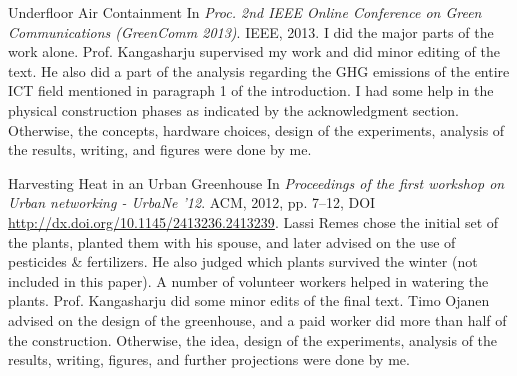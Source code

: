 {Underfloor Air Containment}
{In \textit{Proc. 2nd IEEE Online Conference on Green Communications
(GreenComm 2013)}. IEEE, 2013.}
{}
{I did the major parts of the work alone. Prof. Kangasharju supervised my work
and did minor editing of the text. He also did a part of the analysis
regarding the GHG emissions of the entire ICT field mentioned in paragraph 1
of the introduction. I had some help in the physical construction phases as
indicated by the acknowledgment section.  Otherwise, the concepts, hardware
choices, design of the experiments, analysis of the results, writing, and
figures were done by me.}
\label{pub:uac}


\label{theme:harvesting}

{Harvesting Heat in an Urban Greenhouse}
{In \textit{Proceedings of the first workshop on Urban networking - UrbaNe
'12}. ACM, 2012, pp. 7--12, DOI
\url{http://dx.doi.org/10.1145/2413236.2413239}.}
{}
{Lassi Remes chose the initial set of the plants, planted them with his
spouse, and later advised on the use of pesticides \& fertilizers. He also
judged which plants survived the winter (not included in this paper). A number
of volunteer workers helped in watering the plants. Prof. Kangasharju did
some minor edits of the final text. Timo Ojanen advised on the design of the
greenhouse, and a paid worker did more than half of the construction.
Otherwise, the idea, design of the experiments, analysis of the results,
writing, figures, and further projections were done by me.}
\label{pub:greenhouse}

